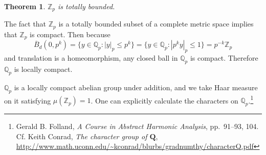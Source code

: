 \documentclass{article}
\newtheorem{theorem}{Theorem}
\theoremstyle{definition}
\begin{document}
\begin{theorem}
$\mathbb{Z}_p$ is totally bounded.
\end{theorem}

The fact that $\mathbb{Z}_p$ is a totally bounded subset of a complete metric space implies that $\mathbb{Z}_p$ is compact. Then because
\[
\overline{B}_d(0,p^k)=\{y \in \mathbb{Q}_p: |y|_p \leq p^k\} = \{y \in \mathbb{Q}_p: |p^k y|_p \leq 1\}
=p^{-k} \mathbb{Z}_p
\]
and translation is a homeomorphism, any closed ball in $\mathbb{Q}_p$ is compact. 
Therefore $\mathbb{Q}_p$ is locally compact. 

$\mathbb{Q}_p$ is a locally compact abelian group under addition, and we take Haar measure on it
satisfying $\mu(\mathbb{Z}_p)=1$. One can explicitly calculate the characters on $\mathbb{Q}_p$.\footnote{Gerald B. Folland, {\em A Course in Abstract Harmonic Analysis}, pp.~91--93, 104. Cf. Keith Conrad, {\em The character group of $\mathbf{Q}$}, \url{http://www.math.uconn.edu/~kconrad/blurbs/gradnumthy/characterQ.pdf}}
\end{document}
